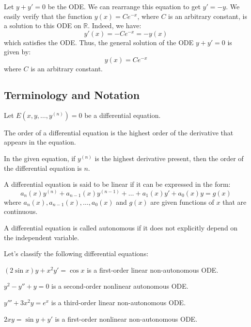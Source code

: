 \begin{eg}
    Let $y + y' = 0$ be the ODE. We can rearrange this equation to get $y' = -y$. We easily verify that the function $y(x) = Ce^{-x}$, where $C$ is an arbitrary constant, is a solution to this ODE on $\mathbb{R}$. Indeed, we have:
    \[
        y'(x) = -Ce^{-x} = -y(x)
    \]
    which satisfies the ODE. Thus, the general solution of the ODE $y + y' = 0$ is given by:
    \[
        y(x) = Ce^{-x}
    \]
    where $C$ is an arbitrary constant.
\end{eg}

\subsection{Terminology and Notation}
Let $E(x, y, \ldots, y^{(n)}) = 0$ be a differential equation.

\begin{definition}
    The order of a differential equation is the highest order of the derivative that appears in the equation.
\end{definition}
In the given equation, if $y^{(n)}$ is the highest derivative present, then the order of the differential equation is $n$.

\begin{definition}
    A differential equation is said to be linear if it can be expressed in the form:
    \[
    a_n(x) y^{(n)} + a_{n-1}(x) y^{(n-1)} + \ldots + a_1(x) y' + a_0(x) y = g(x)
    \]
    where $a_n(x), a_{n-1}(x), \ldots, a_0(x)$ and $g(x)$ are given functions of $x$ that are continuous.
\end{definition}

\begin{definition}
    A differential equation is called autonomous if it does not explicitly depend on the independent variable.
\end{definition}

\begin{eg}
    Let's classify the following differential equations:
    \begin{citemize}
        \item $(2 \sin x) y + x^2 y' = \cos x$ is a first-order linear non-autonomous ODE.
        \item $y^2 - y'' + y = 0$ is a second-order nonlinear autonomous ODE.
        \item $y''' + 3x^2y = e^x$ is a third-order linear non-autonomous ODE.
        \item $2xy = \sin y + y'$ is a first-order nonlinear non-autonomous ODE.
    \end{citemize}
\end{eg}

